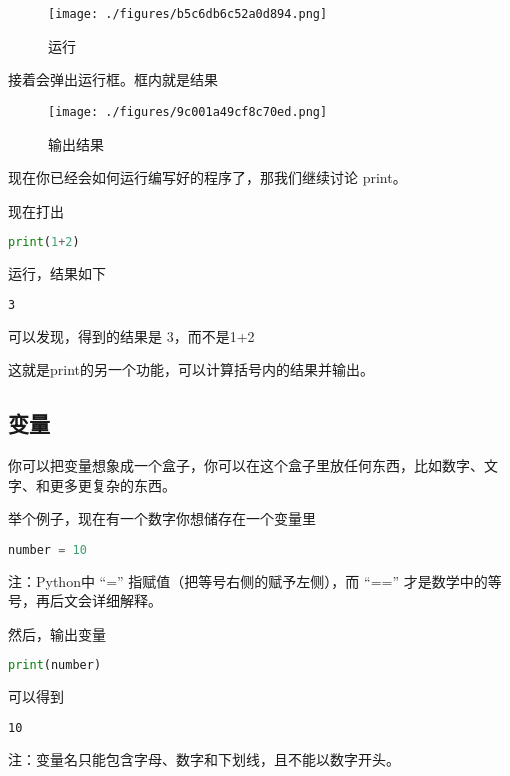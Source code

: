 \begin{figure}[ht]
\centering
\texttt{[image: ./figures/b5c6db6c52a0d894.png]}
\caption{运行} \label{fig_Pyc2_5}
\end{figure}

接着会弹出运行框。框内就是结果

\begin{figure}[ht]
\centering
\texttt{[image: ./figures/9c001a49cf8c70ed.png]}
\caption{输出结果} \label{fig_Pyc2_6}
\end{figure}

现在你已经会如何运行编写好的程序了，那我们继续讨论 print。

现在打出

\begin{lstlisting}[language=python]
print(1+2)
\end{lstlisting}

运行，结果如下

\begin{lstlisting}[language=bash]
3
\end{lstlisting}

可以发现，得到的结果是 3，而不是1+2

这就是print的另一个功能，可以计算括号内的结果并输出。

\subsection{变量}

你可以把变量想象成一个盒子，你可以在这个盒子里放任何东西，比如数字、文字、和更多更复杂的东西。

举个例子，现在有一个数字你想储存在一个变量里

\begin{lstlisting}[language=python]
number = 10
\end{lstlisting}

注：Python中 “=” 指赋值（把等号右侧的赋予左侧），而 “==” 才是数学中的等号，再后文会详细解释。

然后，输出变量

\begin{lstlisting}[language=python]
print(number)
\end{lstlisting}

可以得到

\begin{lstlisting}[language=bash]
10
\end{lstlisting}

注：变量名只能包含字母、数字和下划线，且不能以数字开头。

